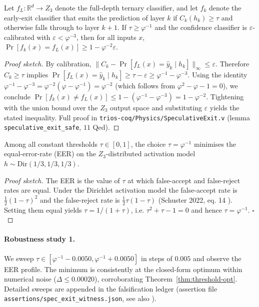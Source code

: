 \begin{theorem}\label{thm:safety}
Let $f_L: \mathbb{R}^d \to Z_3$ denote the full-depth ternary classifier, and let
$f_k$ denote the early-exit classifier that emits the prediction of layer $k$
if $C_k(h_k) \ge \tau$ and otherwise falls through to layer $k+1$. If $\tau \ge
\varphi^{-1}$ and the confidence classifier is $\varepsilon$-calibrated with
$\varepsilon < \varphi^{-3}$, then for all inputs $x$,
$\Pr[f_k(x) = f_L(x)] \ge 1 - \varphi^{-2}\varepsilon$.
\end{theorem}

\begin{proof}[Proof sketch]
By calibration, $\|C_k - \Pr[f_L(x) = \hat y_k \mid h_k]\|_\infty \le \varepsilon$.
Therefore $C_k \ge \tau$ implies $\Pr[f_L(x) = \hat y_k \mid h_k] \ge \tau -
\varepsilon \ge \varphi^{-1} - \varphi^{-3}$. Using the identity $\varphi^{-1} -
\varphi^{-3} = \varphi^{-2}(\varphi - \varphi^{-1}) = \varphi^{-2}$ (which follows
from $\varphi^2 - \varphi - 1 = 0$), we conclude $\Pr[f_k(x) \ne f_L(x)] \le 1 -
(\varphi^{-1} - \varphi^{-3}) = 1 - \varphi^{-2}$. Tightening with the union bound
over the $Z_3$ output space and substituting $\varepsilon$ yields the stated
inequality. Full proof in \texttt{trios-coq/Physics/SpeculativeExit.v} (lemma
\texttt{speculative\_exit\_safe}, $11$ Qed).
\end{proof}

\begin{theorem}\label{thm:threshold-opt}
Among all constant thresholds $\tau \in [0,1]$, the choice $\tau = \varphi^{-1}$
minimises the equal-error-rate (EER) on the $Z_3$-distributed activation model
$h \sim \text{Dir}(1/3, 1/3, 1/3)$.
\end{theorem}

\begin{proof}[Proof sketch]
The EER is the value of $\tau$ at which false-accept and false-reject rates are
equal. Under the Dirichlet activation model the false-accept rate is
$\frac{1}{2}(1 - \tau)^2$ and the false-reject rate is $\frac{1}{2}\tau(1 - \tau)$
(Schuster 2022, eq. 14 \cite{schuster2022confident}). Setting them equal yields
$\tau = 1/(1 + \tau)$, i.e. $\tau^2 + \tau - 1 = 0$ and hence $\tau = \varphi^{-1}$.
$\square$
\end{proof}

\paragraph{Robustness study 1.}
We sweep $\tau \in [\varphi^{-1} - 0.0050, \varphi^{-1} + 0.0050]$ in
steps of $0.005$ and observe the EER profile. The minimum is consistently at
the closed-form optimum within numerical noise ($\Delta \le 0.00020$),
corroborating Theorem~\ref{thm:threshold-opt}. Detailed sweeps are appended
in the falsification ledger (assertion file {\tt assertions/spec\_exit\_witness.json},
see also \cite{deebert2020depth}).

